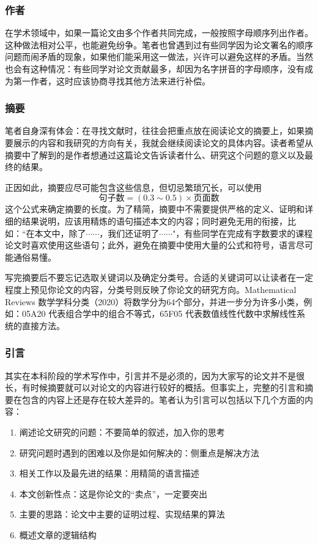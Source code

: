 \documentclass{formatBook}
\begin{document}
\subsubsection{作者}
在学术领域中，如果一篇论文由多个作者共同完成，一般按照字母顺序列出作者。这种做法相对公平，也能避免纷争。笔者也曾遇到过有些同学因为论文署名的顺序问题而闹矛盾的现象，如果他们能采用这一做法，兴许可以避免这样的矛盾。当然也会有这种情况：有些同学对论文贡献最多，却因为名字拼音的字母顺序，没有成为第一作者，这时应该协商寻找其他方法来进行补偿。
\subsubsection{摘要}
笔者自身深有体会：在寻找文献时，往往会把重点放在阅读论文的摘要上，如果摘要展示的内容和我研究的方向有关，我就会继续阅读论文的具体内容。读者希望从摘要中了解到的是作者想通过这篇论文告诉读者什么、研究这个问题的意义以及最终的结果。\par
正因如此，摘要应尽可能包含这些信息，但切忌繁琐冗长，可以使用 $$\text{句子数}=(0.3 \sim 0.5)\times \text{页面数}$$ 这个公式\cite{pak_how_nodate}来确定摘要的长度。为了精简，摘要中不需要提供严格的定义、证明和详细的结果说明，应该用精炼的语句描述本文的内容；同时避免无用的衔接，比如：“在本文中，除了$\cdots\cdots$，我们还证明了$\cdots\cdots$"，有些同学在完成有字数要求的课程论文时喜欢使用这些语句；此外，避免在摘要中使用大量的公式和符号，语言尽可能通俗易懂。\par
写完摘要后不要忘记选取关键词以及确定分类号。合适的关键词可以让读者在一定程度上预见你论文的内容，分类号则反映了你论文的研究方向。Mathematical Reviews 数学学科分类（2020）将数学分为64个部分，并进一步分为许多小类，例如：05A20 代表组合学中的组合不等式，65F05 代表数值线性代数中求解线性系统的直接方法。
\subsubsection{引言}
其实在本科阶段的学术写作中，引言并不是必须的，因为大家写的论文并不是很长，有时候摘要就可以对论文的内容进行较好的概括。但事实上，完整的引言和摘要在包含的内容上还是存在较大差异的。笔者认为引言可以包括以下几个方面的内容：
\begin{enumerate}
    \item 阐述论文研究的问题：不要简单的叙述，加入你的思考
    \item 研究问题时遇到的困难以及你是如何解决的：侧重点是解决方法
    \item 相关工作以及最先进的结果：用精简的语言描述
    \item 本文创新性点：这是你论文的“卖点”，一定要突出
    \item 主要的思路：论文中主要的证明过程、实现结果的算法
    \item 概述文章的逻辑结构
\end{enumerate}
\end{document}
